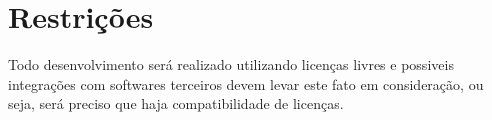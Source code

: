 %
%        
%         
%			
%
%
%			
%


\section{Restrições}\label{sec:restrições}
Todo desenvolvimento será realizado utilizando licenças livres e possiveis integrações com softwares terceiros devem levar este fato em consideração, ou seja, será preciso que haja compatibilidade de licenças.

